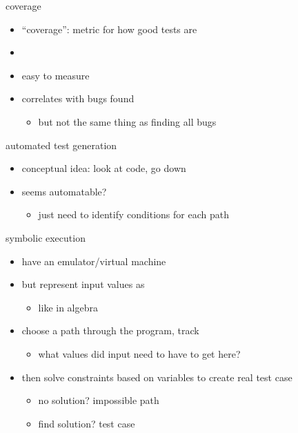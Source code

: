 \begin{frame}{coverage}
    \begin{itemize}
        \item ``coverage'': metric for how good tests are
        \vspace{.5cm}
        \item {}
        \item easy to measure
        \item correlates with bugs found
            \begin{itemize}
            \item but not the same thing as finding all bugs
            \end{itemize}
    \end{itemize}
\end{frame}

\begin{frame}{automated test generation}
    \begin{itemize}
        \item conceptual idea: look at code, go down 
    \item seems automatable?
        \begin{itemize}
        \item just need to identify conditions for each path
        \end{itemize}
    \end{itemize}
\end{frame}

\begin{frame}{symbolic execution}
    \begin{itemize}
    \item have an emulator/virtual machine
    \item but represent input values as 
        \begin{itemize}
            \item like in algebra
        \end{itemize}
    \item choose a path through the program, track 
        \begin{itemize}
        \item what values did input need to have to get here?
        \end{itemize}
    \item then solve constraints based on variables to create real test case
        \begin{itemize}
        \item no solution? impossible path
        \item find solution? test case
        \end{itemize}
    \end{itemize}
\end{frame}

